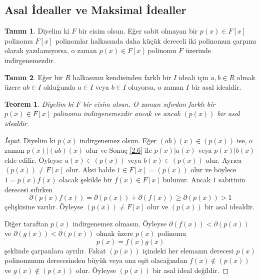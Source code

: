 \documentclass{article}
\newtheorem{thm}{Teorem}[section]
\theoremstyle{definition}
\newtheorem{defn}{Tanım}[section]
\theoremstyle{remark}
\begin{document}
         \subsection{Asal İdealler ve Maksimal İdealler}
    		
    		\begin{defn}
    		    Diyelim ki $F$ bir cisim olsun. Eğer sabit olmayan bir $p(x) \in F[x]$ polinomu $F[x]$ polinomlar halkasında daha küçük dereceli iki polinomun çarpımı olarak yazılamıyorsa, o zaman $p(x) \in F[x]$ polinomu $F$ üzerinde indirgenemezdir.
    		\end{defn}
    		
    		\begin{defn}
    		    Eğer bir $R$ halkasının kendisinden farklı bir $I$ ideali için $a, b \in R$ olmak üzere $ab \in I$ olduğunda $a \in I$ veya $b \in I$ oluyorsa, o zaman $I$ bir asal idealdir.
    		\end{defn}
    		
    		\begin{thm}
    		    Diyelim ki $F$ bir cisim olsun. O zaman sıfırdan farklı bir $p(x) \in F[x]$ polinomu indirgenemezdir ancak ve ancak $(p(x))$ bir asal idealdir.
		    \end{thm}
		    
		    \begin{proof}[İspat]
		        Diyelim ki $p(x)$ indirgenemez olsun. Eğer $(ab)(x) \in (p(x))$ ise, o zaman $p(x) | (ab)(x)$ olur ve Sonuç \ref{2.6} ile $p(x) | a(x)$ veya $p(x) | b(x)$ elde edilir. Öyleyse $a(x) \in (p(x))$ veya $b(x) \in (p(x))$ olur. Ayrıca $(p(x)) \neq F[x]$ olur. Aksi halde $1 \in F[x] = (p(x))$ olur ve böylece $1 = p(x)f(x)$ olacak şekilde bir $f(x) \in F[x]$ bulunur. Ancak $1$ sabitinin derecesi sıfırken
		        \begin{equation*}
		            \partial(p(x)f(x)) = \partial(p(x)) + \partial(f(x)) \geq \partial(p(x)) > 1
		        \end{equation*}
		        çelişkisine varılır. Öyleyse $(p(x)) \neq F[x]$ olur ve $(p(x))$ bir asal idealdir.\par
		        Diğer taraftan $p(x)$ indirgenemez olmasın. Öyleyse $\partial(f(x)) < \partial(p(x))$ ve $\partial(g(x)) < \partial(p(x))$ olmak üzere $p(x)$ polinomu
		        \begin{equation*}
		            p(x) = f(x)g(x)
		        \end{equation*}
		        şeklinde çarpanlara ayrılır. Fakat $(p(x))$ içindeki her elemanın derecesi $p(x)$ polinomunun derecesinden büyük veya ona eşit olacağından $f(x) \notin (p(x))$ ve $g(x) \notin (p(x))$ olur. Öyleyse $(p(x))$ bir asal ideal değildir.
		    \end{proof}
    		
\end{document}
